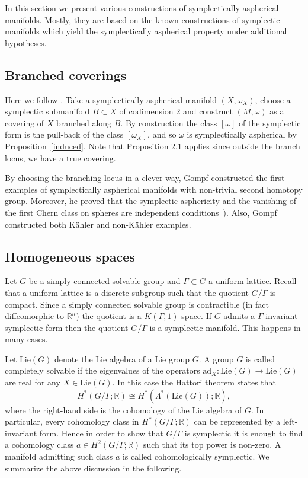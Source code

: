 \documentclass[12pt]{amsart}
\newcommand{\B}[1]{{\mathbb #1}}
\newcommand\R{\B R}
\numberwithin{equation}{section}
\theoremstyle{definition}
\theoremstyle{remark}
\newcommand\propref{Proposition~\ref}
\numberwithin{figure}{section}
\numberwithin{table}{section}
\newcommand{\om}{{\omega}}
\newcommand{\Ga}{{\Gamma}}
\newcommand{\Mo}{(M,\omega )}
\begin{document}
In this section we present various constructions of symplectically 
aspherical manifolds. Mostly, they are based on the known constructions 
of symplectic manifolds  which yield the symplectically aspherical property 
under additional hypotheses. 
 
 
 
\subsection{Branched coverings}\label{SS:gompf} 
Here we follow \cite{G2}. Take a symplectically aspherical manifold $(X,\om_X)$,  
choose a symplectic submanifold 
$B\subset X$ of codimension 2 and construct $\Mo$ 
as a covering of $X$ branched along $B$. By construction 
the class $[\om]$ of the symplectic form is the pull-back 
of the class $[\om_X]$, and so $\omega$ is symplectically aspherical by 
\propref{induced}.   
Note that Proposition 2.1 applies since outside the branch locus, we have a true 
covering. 
 
By choosing the branching locus in a clever way, Gompf  
constructed the first examples of symplectically aspherical 
manifolds with non-trivial second homotopy group. Moreover, 
he proved that the symplectic asphericity and the vanishing 
of the first Chern class on spheres are independent conditions~\cite[Theorem 
7]{G2}).  
Also, Gompf constructed both K\"ahler and non-K\"ahler 
examples. 
 
\subsection{Homogeneous spaces}\label{SS:homogeneous} 
 
Let $G$ be a simply connected solvable group and $\Ga \subset G$ 
a uniform lattice. Recall that a uniform lattice is a discrete 
subgroup such that the quotient $G/\Ga$ is compact. Since 
a simply connected solvable group is contractible (in fact 
diffeomorphic to $\B R^n$) the quotient is a $K(\Ga,1)$-space. 
If $G$ admits a $\Ga$-invariant symplectic form then the 
quotient $G/\Ga$ is a symplectic manifold. This happens in 
many cases. 
 
Let $\text{Lie}(G)$ denote the Lie algebra of a Lie group $G$. 
A group $G$ is called completely solvable if the eigenvalues 
of the operators $\text{ad}_X:\text{Lie}(G)\to \text{Lie}(G)$ are 
real for any $X\in \text{Lie}(G)$. In this case the Hattori 
theorem \cite{Ha} states that 
$$ 
H^*(G/\Gamma;\B R)\cong H^*(\Lambda^*(\text{Lie}(G));\B R), 
$$ 
where the right-hand side is the cohomology of the Lie algebra 
of $G$. In particular, every cohomology class in $H^*(G/\Ga; \R)$ can be 
represented by a left-invariant form.  
Hence in order to show that $G/\Gamma$ is symplectic 
it is enough to find a cohomology class $a\in H^2(G/\Gamma;\B R)$ 
such that its top power is non-zero. A manifold admitting 
such class $a$ is called cohomologically symplectic. We summarize 
the above discussion in the following. 
 
\end{document}

